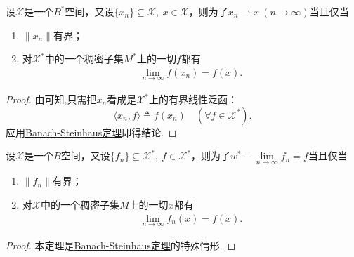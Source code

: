 \documentclass[../../main.tex]{subfiles}%
\begin{document}
\begin{theorem}\label{theorem:弱收敛的充要条件111}
设$\mathscr{X}$是一个$B^*$空间，又设$\{x_n\}\subseteq\mathscr{X},\ x\in\mathscr{X}$，则为了$x_n\rightharpoonup x\ (n\to\infty)$当且仅当
\begin{enumerate}[(1)]
\item $\|x_n\|$有界；
\item 对$\mathscr{X}^*$中的一个稠密子集$M^*$上的一切$f$都有
\begin{align*}
\lim\limits_{n\to\infty}f(x_n)=f(x).
\end{align*}
\end{enumerate}
\end{theorem}
\begin{proof}
由可知,只需把$x_n$看成是$\mathscr{X}^*$上的有界线性泛函：
$$\langle x_n,f\rangle\triangleq f(x_n)\quad(\forall f\in\mathscr{X}^*).$$
应用\hyperref[theorem:泛函分析--Banach-Steinhaus定理]{Banach-Steinhaus定理}即得结论.
\end{proof}

\begin{theorem}\label{theorem:泛函分析--定理2.5.21}
设$\mathscr{X}$是一个$B$空间，又设$\{f_n\}\subseteq\mathscr{X}^*,\ f\in\mathscr{X}^*$，则为了$w^*-\lim\limits_{n\to\infty}f_n=f$当且仅当
\begin{enumerate}[(1)]
\item $\|f_n\|$有界；
\item 对$\mathscr{X}$中的一个稠密子集$M$上的一切$x$都有
\begin{align*}
\lim\limits_{n\to\infty}f_n(x)=f(x).
\end{align*}
\end{enumerate}
\end{theorem}
\begin{proof}
本定理是\hyperref[theorem:泛函分析--Banach-Steinhaus定理]{Banach-Steinhaus定理}的特殊情形.
\end{proof}
\end{document}
